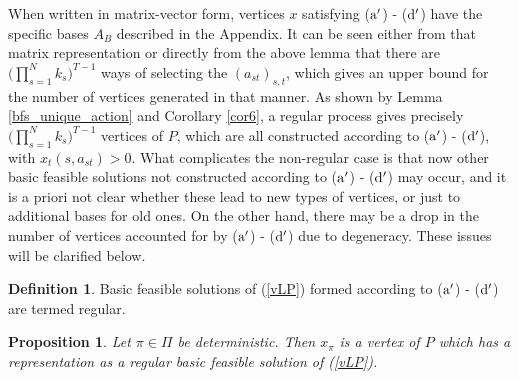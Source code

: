 \documentclass{article}
\newtheorem{proposition}[theorem]{Proposition}
\theoremstyle{definition}
\newtheorem{definition}[theorem]{Definition}
\numberwithin{equation}{section}
\begin{document}
When written in  matrix-vector form, vertices $x$ satisfying (${\rm a}'$) - (${\rm d}'$)
have the specific bases $A_B$ described in the Appendix. 
It can be seen either from that matrix representation or directly from the above lemma that
there are $\bigl(\prod_{s = 1}^{N}k_s\bigr)^{T-1}$ ways of selecting the $(a_{st})_{s,t}$, which 
gives an upper bound for the number of vertices generated in that manner.
As shown by
Lemma \ref{bfs_unique_action} and Corollary \ref{cor6},  a regular process  gives
precisely $\bigl(\prod_{s = 1}^{N}k_s\bigr)^{T-1}$ vertices of $P$, which are all constructed
according to (${\rm a}'$) - (${\rm d}'$), with 
$x_t(s,a_{st}) > 0$.
What complicates the
non-regular case  is that now 
other basic feasible
solutions not constructed according to (${\rm a}'$) - (${\rm d}'$) may occur, and it is a priori not clear whether these lead to new types of vertices, or just to additional bases for old ones.  
On the other hand, there may be a drop in the number of vertices accounted for by
(${\rm a}'$) - (${\rm d}'$)
due to degeneracy. These issues will be clarified below.



\begin{definition}
    Basic feasible solutions of {\rm (\ref{vLP})} formed according to {\rm (${\rm a}'$) - (${\rm d}'$)} are termed regular.
    \end{definition}



\begin{proposition}
\label{new1}
    Let $\pi\in \Pi$ be deterministic. Then $x_\pi$ is a vertex of $P$
    which has a representation as a regular basic feasible solution of {\rm (\ref{vLP})}.
\end{proposition}
\end{document}
